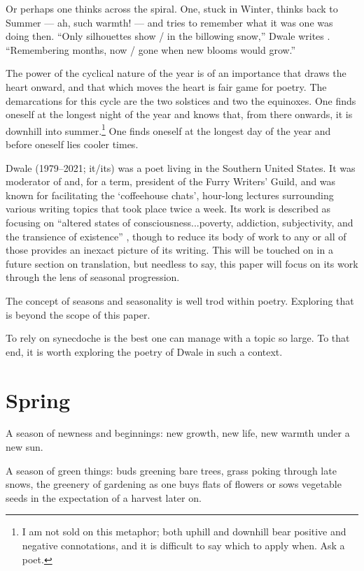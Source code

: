 \documentclass[12pt,oneside]{memoir}
\begin{document}
Or perhaps one thinks across the spiral. One, stuck in Winter, thinks back to Summer --- ah, such warmth! --- and tries to remember what it was one was doing then. ``Only silhouettes show / in the billowing snow,'' Dwale writes \parencite[19]{leaves}. ``Remembering months, now / gone when new blooms would grow.''

The power of the cyclical nature of the year is of an importance that draws the heart onward, and that which moves the heart is fair game for poetry. The demarcations for this cycle are the two solstices and two the equinoxes. One finds oneself at the longest night of the year and knows that, from there onwards, it is downhill into summer.\footnote{I am not sold on this metaphor; both uphill and downhill bear positive and negative connotations, and it is difficult to say which to apply when. Ask a poet.} One finds oneself at the longest day of the year and before oneself lies cooler times.

Dwale (1979--2021; it/its) was a poet living in the Southern United States. It was moderator of and, for a term, president of the Furry Writers' Guild, and was known for facilitating the `coffeehouse chats', hour-long lectures surrounding various writing topics that took place twice a week. Its work is described as focusing on ``altered states of consciousness...poverty, addiction, subjectivity, and the transience of existence'' \parencite{dwale}, though to reduce its body of work to any or all of those provides an inexact picture of its writing. This will be touched on in a future section on translation, but needless to say, this paper will focus on its work through the lens of seasonal progression. 

The concept of seasons and seasonality is well trod within poetry. Exploring that is beyond the scope of this paper.
\begin{comment}
\footnote{Or perhaps my abilities as a writer}
\end{comment}
To rely on synecdoche is the best one can manage with a topic so large. To that end, it is worth exploring the poetry of Dwale in such a context.

\section*{Spring}

A season of newness and beginnings: new growth, new life, new warmth under a new sun.

A season of green things: buds greening bare trees, grass poking through late snows, the greenery of gardening as one buys flats of flowers or sows vegetable seeds in the expectation of a harvest later on.
\end{document}
